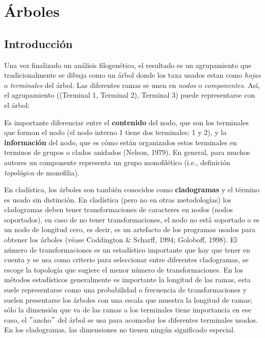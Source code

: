 \chapter{\'Arboles}
\section*{Introducci\'on}

Una vez finalizado un an\'alisis filogen\'etico, el resultado es un agrupamiento que tradicionalmente se dibuja como un \'arbol donde los taxa usados estan como \emph{hojas} o \emph{terminales} del \'arbol. Las diferentes ramas se unen en \emph{nodos} o \emph{componentes}. As\'i, el agrupamiento ((Terminal 1, Terminal 2), Terminal 3) puede representarse con el \'arbol:

\begin{center}
%
%
\end{center}

Es importante diferenciar entre el \textbf{contenido} del nodo, que son los terminales que forman el nodo (el nodo interno 1 tiene dos terminales: 1 y 2), y la \textbf{informaci\'on} del nodo, que es c\'omo est\'an organizados estos terminales en terminos de grupos o clados anidados (Nelson, 1979). En general, para muchos autores un componente representa un grupo monofil\'etico (i.e., definici\'on \emph{topol\'ogica} de monofilia).

En clad\'istica, los \'arboles son tambi\'en conocidos como \textbf{cladogramas} y el t\'ermino es usado sin distinci\'on. En clad\'istica (pero no en otras metodolog\'ias) los cladogramas deben tener transformaciones de caracteres en nodos (nodos soportados), en caso de no tener transformaciones, el nodo no est\'a soportado o es un nodo de longitud cero, es decir, es un artefacto de los programas usados para obtener los \'arboles (v\'ease Coddington \& Scharff, 1994; Goloboff, 1998). El n\'umero de transformaciones es un estad\'istico importante que hay que tener en cuenta y se usa como criterio para seleccionar entre diferentes cladogramas, se escoge la topolog\'ia que sugiere el  menor n\'umero de transformaciones. En los m\'etodos estad\'isticos generalmente es importante la longitud de las ramas, esta suele representarse como una probabilidad o frecuencia de transformaciones y suelen presentarse los \'arboles con una escala que muestra la longitud de ramas; s\'olo la dimensi\'on que va de las ramas a los terminales tiene importancia en ese caso, el $"$ancho$"$ del \'arbol se usa para acomodar los diferentes terminales usados. En los cladogramas, las dimensiones no tienen ning\'un significado especial.


